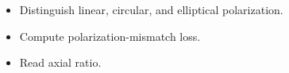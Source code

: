 \begin{objectives}
\begin{itemize}[leftmargin=1.4em,itemsep=2pt]
\item Distinguish linear, circular, and elliptical polarization.
\item Compute polarization-mismatch loss.
\item Read axial ratio.
\end{itemize}
\end{objectives}
